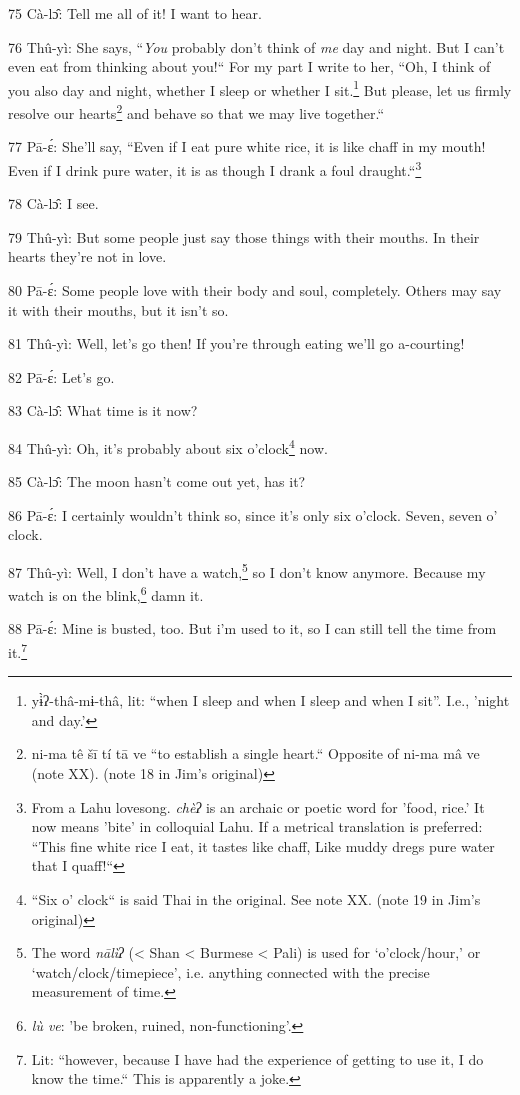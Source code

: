 75 Cà-lɔ̂: Tell me all of it! I want to hear.

76 Thû-yì: She says, ``\textit{You} probably don't think of \textit{me}
day and night. But I can't even eat from thinking about you!`` For my part
I write to her, ``Oh, I think of you also day and night, whether I sleep
or whether I sit.\footnote{yɨ̀ʔ-thâ-mɨ-thâ, lit: ``when I sleep and when I sleep and when I sit''. I.e., 'night and day.'} But please, let us firmly resolve our hearts\footnote{ni-ma tê šī tí tā ve ``to establish a single heart.`` Opposite of ni-ma mâ ve (note XX). (note 18 in Jim's original)} and behave
so that we may live together.``

77 Pā-ɛ́: She'll say, ``Even if I eat pure white rice, it is like chaff
in my mouth! Even if I drink pure water, it is as though I drank a foul draught.``\footnote{From a Lahu lovesong. \textit{chèʔ} is an archaic or poetic word for 'food, rice.' It now means 'bite' in colloquial Lahu. If a metrical translation is preferred:  ``This fine white rice I eat, it tastes like chaff,  Like muddy dregs pure water that I quaff!``}

78 Cà-lɔ̂: I see.

79 Thû-yì: But some people just say those things with their mouths. In their
hearts they're not in love.

80 Pā-ɛ́: Some people love with their body and soul, completely. Others may
say it with their mouths, but it isn't so.

81 Thû-yì: Well, let's go then! If you're through eating we'll go a-courting!

82 Pā-ɛ́: Let's go.

83 Cà-lɔ̂: What time is it now?

84 Thû-yì: Oh, it's probably about\textit{ }six o'clock\footnote{``Six o' clock`` is said Thai in the original. See note XX. (note 19 in Jim's original)} now.

85 Cà-lɔ̂: The moon hasn't come out yet, has it?

86 Pā-ɛ́: I certainly wouldn't think so, since it's only six o'clock. Seven,
seven o' clock.

87 Thû-yì: Well, I don't have a watch,\footnote{The word \textit{nālìʔ }(< Shan < Burmese < Pali) is used for `o'clock/hour,' or `watch/clock/timepiece', i.e. anything connected with the precise measurement of time.} so I don't know anymore. Because my
watch is on the blink,\footnote{\textit{lù ve}: 'be broken, ruined, non-functioning'.} damn it.

88 Pā-ɛ́: Mine is busted, too. But i'm used to it, so I can still tell the
time from it.\footnote{Lit: ``however, because I have had the experience of getting to use it, I do know the time.`` This is apparently a joke.}


